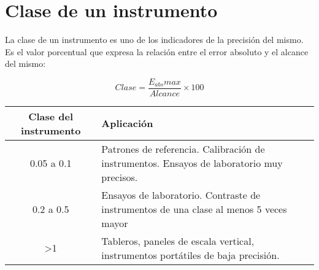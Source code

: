 \section{Clase de un instrumento}
La clase de un instrumento es uno de los indicadores de la precisión del mismo. Es el valor porcentual que expresa la relación entre el error absoluto y el alcance del mismo:

$$ Clase = \frac{E_{abs}max}{Alcance}\times 100 $$

\begin{tabular}{|c|p{7cm}|}
\hline 
Clase del instrumento & Aplicación \\ 
\hline 
0.05 a 0.1 & Patrones de referencia. Calibración de instrumentos. Ensayos de laboratorio muy precisos. \\ 
\hline 
0.2 a 0.5 & Ensayos de laboratorio. Contraste de instrumentos de una clase al menos 5 veces mayor \\ 
\hline 
>1 & Tableros, paneles de escala vertical, instrumentos portátiles de baja precisión. \\ 
\hline 
\end{tabular} 